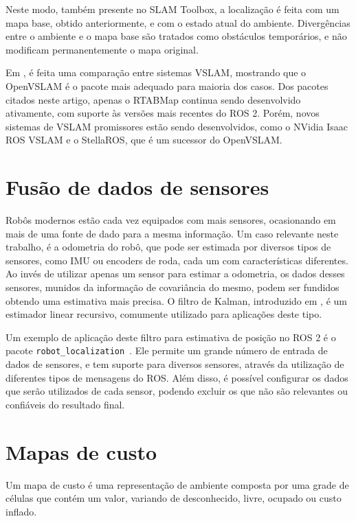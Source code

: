 \documentclass[repeatfields,xlists,xpacks,oneside,yearsonly]{ufrgscca}
\begin{document}
Neste modo, também presente no SLAM Toolbox, a localização é feita
com um mapa base, obtido anteriormente, e com o estado atual do
ambiente. Divergências entre o ambiente e o mapa base são tratados
como obstáculos temporários, e não modificam permanentemente o mapa
original.

Em \textcite{VSLAM}, é feita uma comparação entre sistemas VSLAM,
mostrando que o OpenVSLAM é o pacote mais adequado para maioria dos
casos. Dos pacotes citados neste artigo, apenas o RTABMap continua
sendo desenvolvido ativamente, com suporte às versões mais recentes
do ROS 2. Porém, novos sistemas de VSLAM promissores estão sendo
desenvolvidos, como o NVidia Isaac ROS VSLAM e o StellaROS, que é um
sucessor do OpenVSLAM.

\section{Fusão de dados de sensores}

Robôs modernos estão cada vez equipados com mais sensores,
ocasionando em mais de uma fonte de dado para a mesma informação. Um
caso relevante neste trabalho, é a odometria do robô, que pode ser
estimada por diversos tipos de sensores, como IMU ou encoders de
roda, cada um com características diferentes. Ao invés de utilizar
apenas um sensor para estimar a odometria, os dados desses sensores,
munidos da informação de covariância do mesmo, podem ser fundidos
obtendo uma estimativa mais precisa. O filtro de Kalman, introduzido
em \textcite{KalmanFilter}, é um estimador linear recursivo,
comumente utilizado para aplicações deste tipo.

Um exemplo de aplicação deste filtro para estimativa de posição no
ROS 2 é o pacote
\texttt{robot\_localization}~\cite{robot_localization_paper}. Ele
permite um grande número de entrada de dados de sensores, e tem
suporte para diversos sensores, através da utilização de diferentes
tipos de mensagens do ROS. Além disso, é possível configurar os dados
que serão utilizados de cada sensor, podendo excluir os que não são
relevantes ou confiáveis do resultado final.

\section{Mapas de custo}

Um mapa de custo é uma representação de ambiente composta por uma
grade de células que contém um valor, variando de desconhecido,
livre, ocupado ou custo inflado.
\end{document}
